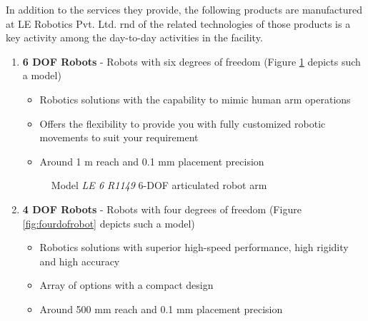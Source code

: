 \documentclass[a4paper,12pt]{report}%
\begin{document}
In addition to the services they provide, the following products are manufactured at LE Robotics Pvt. Ltd. \ac{rnd} of the related technologies of those products is a key activity among the day-to-day activities in the facility. 


\begin{enumerate}
	\item \textbf{6 DOF Robots} - Robots with six degrees of freedom (Figure \ref{fig:sixdofrobot} depicts such a model)
	\begin{itemize}
		\item Robotics solutions with the capability to mimic human arm operations
		\item Offers the flexibility to provide you with fully customized robotic movements to suit your requirement
		\item  Around 1 m reach and 0.1 mm placement precision
	\end{itemize}
	
	\begin{figure}[H]
		\centering
		\caption{Model \textit{LE 6 R1149} 6-DOF articulated robot arm\cite{articlulated_robots}}
		\label{fig:sixdofrobot}
	\end{figure}
	
	
	
	\item\textbf{ 4 DOF Robots} - Robots with four degrees of freedom (Figure \ref{fig:fourdofrobot} depicts such a model)
	\begin{itemize}
		\item Robotics solutions with superior high-speed performance, high rigidity and high accuracy
		\item Array of options with a compact design
		\item Around 500 mm reach and 0.1 mm placement precision
	\end{itemize}


\end{enumerate}
\end{document}
